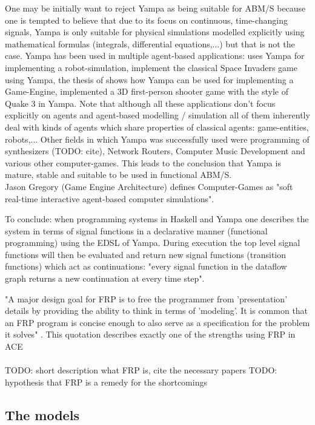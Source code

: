 One may be initially want to reject Yampa as being suitable for ABM/S because one is tempted to believe that due to its focus on continuous, time-changing signals, Yampa is only suitable for physical simulations modelled explicitly using mathematical formulas (integrals, differential equations,...) but that is not the case. Yampa has been used in multiple agent-based applications: \cite{Hudak2003} uses Yampa for implementing a robot-simulation, \cite{Courtney2003} implement the classical Space Invaders game using Yampa, the thesis of \cite{Meisinger2010} shows how Yampa can be used for implementing a Game-Engine, \cite{Frag2005} implemented a 3D first-person shooter game with the style of Quake 3 in Yampa. Note that although all these applications don't focus explicitly on agents and agent-based modelling / simulation all of them inherently deal with kinds of agents which share properties of classical agents: game-entities, robots,... Other fields in which Yampa was successfully used were programming of synthesizers (TODO: cite), Network Routers, Computer Music Development and various other computer-games. This leads to the conclusion that Yampa is mature, stable and suitable to be used in functional ABM/S. \\
Jason Gregory (Game Engine Architecture) defines Computer-Games as "soft real-time interactive agent-based computer simulations".

To conclude: when programming systems in Haskell and Yampa one describes the system in terms of signal functions in a declarative manner (functional programming) using the EDSL of Yampa. During execution the top level signal functions will then be evaluated and return new signal functions (transition functions) which act as continuations: "every signal function in the dataflow graph returns a new continuation at every time step".

"A major design goal for FRP is to free the programmer from 'presentation' details by providing the ability to think in terms of 'modeling'. It is common that an FRP program is concise enough to also serve as a specification for the problem it solves" \cite{Wan2000}. This quotation describes exactly one of the strengths using FRP in ACE \\
\\

TODO: short description what FRP is, cite the necessary papers
TODO: hypothesis that FRP is a remedy for the shortcomings

\subsection{The models}
